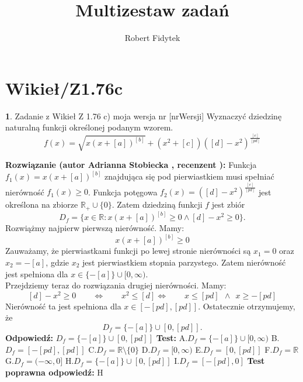 \documentclass[12pt, a4paper]{article}
\title{Multizestaw zadań}
\author{Robert Fidytek}
\date{}
\theoremstyle{definition} %
\newtheorem{zad}{}
\newcommand{\kategoria}[1]{\section{#1}} %
\newcommand{\zadStart}[1]{\begin{zad}#1\newline} %
\newcommand{\zadStop}{\end{zad}}   %
\newcommand{\rozwStart}[2]{\noindent \textbf{Rozwiązanie (autor #1 , recenzent #2): }\newline} %
\newcommand{\rozwStop}{\newline}                                            %
\newcommand{\odpStart}{\noindent \textbf{Odpowiedź:}\newline}    %
\newcommand{\odpStop}{\newline}                                             %
\newcommand{\testStart}{\noindent \textbf{Test:}\newline} %
\newcommand{\testStop}{\newline} %
\newcommand{\kluczStart}{\noindent \textbf{Test poprawna odpowiedź:}\newline} %
\newcommand{\kluczStop}{\newline} %
\begin{document}
\maketitle


\kategoria{Wikieł/Z1.76c}
\zadStart{Zadanie z Wikieł Z 1.76 c) moja wersja nr [nrWersji]}
Wyznaczyć dziedzinę naturalną funkcji określonej podanym wzorem.
$$f(x)=\sqrt{x(x+[a])^{[b]}}+(x^2+[c])([d]-x^2)^{\frac{[e]}{[pd]}}$$
\zadStop
\rozwStart{Adrianna Stobiecka}{}
Funkcja $f_1(x)=x(x+[a])^{[b]}$ znajdująca się pod pierwiastkiem musi spełniać nierówność $f_1(x)\geq0$.
Funkcja potęgowa $f_2(x)=([d]-x^2)^{\frac{[e]}{[pd]}}$ jest określona na zbiorze $\mathbb{R}_+\cup\{0\}$. Zatem dziedziną funkcji $f$ jest zbiór
$$D_{f}=\{x\in\mathbb{R}:x(x+[a])^{[b]}\geq0 \land [d]-x^2\geq0\}.$$
Rozwiążmy najpierw pierwszą nierówność. Mamy:
$$x(x+[a])^{[b]}\geq0$$
Zauważamy, że pierwiastkami funkcji po lewej stronie nierówności są $x_1=0$ oraz $x_2=-[a]$, gdzie $x_2$ jest pierwiastkiem stopnia parzystego. Zatem nierówność jest spełniona dla $x\in\{-[a]\}\cup[0,\infty)$.
\\Przejdziemy teraz do rozwiązania drugiej nierówności. Mamy:
$$[d]-x^2\geq0\qquad\Leftrightarrow\qquad x^2\leq[d]\Leftrightarrow\qquad x\leq[pd]~~\land~~ x\geq-[pd]$$
Nierówność ta jest spełniona dla $x\in[-[pd],[pd]]$.
Ostatecznie otrzymujemy, że
$$D_{f}=\{-[a]\}\cup[0,[pd]].$$
\rozwStop
\odpStart
$D_{f}=\{-[a]\}\cup[0,[pd]]$
\odpStop
\testStart
A.$D_{f}=\{-[a]\}\cup[0,\infty)$
B.$D_{f}=[-[pd],[pd]]$
C.$D_{f}=\mathbb{R}\setminus\{0\}$
D.$D_{f}=[0,\infty)$
E.$D_{f}=[0,[pd]]$
F.$D_{f}=\mathbb{R}$
G.$D_{f}=(-\infty,0]$
H.$D_{f}=\{-[a]\}\cup[0,[pd]]$
I.$D_{f}=[-[pd],0]$
\testStop
\kluczStart
H
\kluczStop
\end{document}
